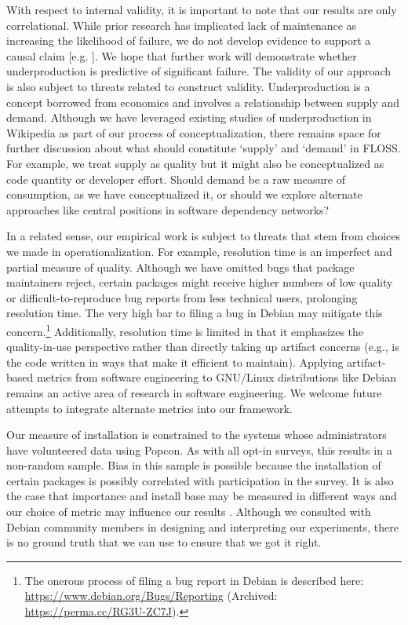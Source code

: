 \documentclass[10pt,conference]{IEEEtran}\usepackage[]{graphicx}\usepackage[usenames,dvipsnames]{color}
\begin{document}
With respect to internal validity, it is important to note that our results are only correlational. While prior research has implicated lack of maintenance as increasing the likelihood of failure, 
we do not develop evidence to support a causal claim 
[e.g. ]. We hope that further work will demonstrate whether underproduction is predictive of significant failure. The validity of our approach is also subject to threats related to construct validity. Underproduction is a concept borrowed from economics and involves a relationship between supply and demand. Although we have leveraged existing studies of underproduction in Wikipedia as part of our process of conceptualization, there remains space for further discussion about what should constitute `supply' and `demand' in FLOSS. For example, we treat supply as quality but it might also be conceptualized as code quantity or developer effort. Should demand be a raw measure of consumption, as we have conceptualized it, or should we explore alternate approaches like central positions in software dependency networks? 

In a related sense, our empirical work is subject to threats that stem from choices we made in operationalization. For example, resolution time is an imperfect and partial measure of quality. Although we have omitted bugs that package maintainers reject, certain packages might receive higher numbers of low quality or difficult-to-reproduce bug reports from less technical users, prolonging resolution time. The very high bar to filing a bug in Debian may mitigate this concern.\footnote{The onerous process of filing a bug report in Debian is described here: \url{https://www.debian.org/Bugs/Reporting} (Archived: \url{https://perma.cc/RG3U-ZC7J}).} Additionally, resolution time is limited in that it emphasizes the quality-in-use perspective rather than directly taking up artifact concerns (e.g., is the code written in ways that make it efficient to maintain). Applying artifact-based metrics from software engineering to GNU/Linux distributions like Debian remains an active area of research in software engineering. We welcome future attempts to integrate alternate metrics into our framework.

Our measure of installation is constrained to the systems whose administrators have volunteered data using Popcon. As with all opt-in surveys, this results in a non-random sample. Bias in this sample is possible because the installation of certain packages is possibly correlated with participation in the survey.
It is also the case that importance and install base may be measured in different ways and our choice of metric may influence our results \cite{zerouali_diversity_2019}.
Although we consulted with Debian community members in designing and interpreting our experiments, there is no ground truth that we can use to ensure that we got it right. 
\end{document}
